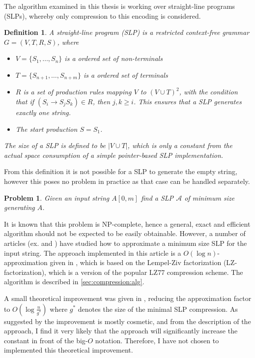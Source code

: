 \documentclass[twoside,11pt,openright]{report}
\newcommand{\str}[3]{#1[#2, #3]}
\newcommand{\SLP}[1] {\mathcal{#1}}
\newtheorem{mydef}{Definition}
\newtheorem{problem}{Problem}
\begin{document}
The algorithm examined in this thesis is working over straight-line programs (SLPs), whereby only compression to this encoding is considered.
\begin{mydef}
  \label{def:slp}
  A straight-line program (SLP) is a restricted context-free grammar $G = (V, T, R, S)$, where
  \begin{itemize}
    \item $V = \{ S_1, \dots, S_n\}$ is a ordered set of non-terminals
    \item $T = \{ S_{n + 1}, \dots, S_{n + m} \}$ is a ordered set of terminals
    \item $R$ is a set of production rules mapping $V$ to $(V \cup T)^2$, with the condition that if $(S_i \to S_jS_k) \in R$, then $j,k \geq i$. This ensures that a SLP generates exactly one string.
    \item The start production $S = S_1$.
  \end{itemize}
  The size of a SLP is defined to be $|V \cup T|$, which is only a constant from the actual space consumption of a simple pointer-based SLP implementation.
\end{mydef}
From this definition it is not possible for a SLP to generate the empty string, however this poses no problem in practice as that case can be handled separately.
\begin{problem}
  \label{compression:problem:minimum-slp}
  Given an input string $\str{A}{0}{m}$ find a SLP $\SLP{A}$ of minimum size generating $A$.
\end{problem}
It is known \cite[p. 212]{Rytter2003211} that this problem is NP-complete, hence a general, exact and efficient algorithm should not be expected to be easily obtainable. However, a number of articles (ex. \cite{Rytter2003211} and \cite{Sakamoto2005416}) have studied how to approximate a minimum size SLP for the input string. The approach implemented in this article is a $O(\log{n})$-approximation given in \cite{Rytter2003211}, which is based on the Lempel-Ziv factorization (LZ-factorization), which is a version of the popular LZ77 compression scheme. The algorithm is described in \cref{sec:compression:alg}.

A small theoretical improvement was given in \cite{Rytter2003211}, reducing the approximation factor to $O(\log{\frac{n}{g^*}})$ where $g^*$ denotes the size of the minimal SLP compression. As suggested by \cite{Rytter2003211} the improvement is mostly cosmetic, and from the description of the approach, I find it very likely that the approach will significantly increase the constant in front of the big-$O$ notation. Therefore, I have not chosen to implemented this theoretical improvement.
\end{document}
